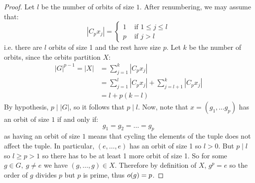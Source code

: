 \documentclass[../main.tex]{subfiles}
\begin{document}
\begin{proof}
  Let $l$ be the number of orbits of size $1$.
  After renumbering, we may assume that:
  \[
    |C_p x_j| = \begin{cases}
    1 & \text{ if } 1 \leq j \leq l \\
    p & \text{ if } j > l
    \end{cases}
  \]
  i.e. there are $l$ orbits of size 1 and the rest have size $p$.
  Let $k$ be the number of orbits, since the orbits partition $X$:
  \begin{align*}
    |G|^{p - 1} = |X| &= \sum_{j=1}^{k} |C_p x_j| \\
                      &= \sum_{j=1}^{l} |C_p x_j| + \sum_{j=l+1}^{k} |C_p x_j| \\
                      &= l + p(k - l)
  \end{align*}
  By hypothesis, $p \mid |G|$, so it follows that $p \mid l$.
  Now, note that $x = (g_1, \ldots g_p)$ has an orbit of size $1$ if and only if:
  \[
    g_1 = g_2 = \ldots = g_p
  \]
  as having an orbit of size $1$ means that cycling the elements of the tuple does not affect the tuple.
  In particular, $(e, \ldots, e)$ has an orbit of size 1 so $l > 0$.
  But $p \mid l$ so $l \geq p > 1$ so there has to be at least 1 more orbit of size 1.
  So for some $g \in G,\ g \neq e$ we have $(g, \ldots, g) \in X$.
  Therefore by definition of $X$, $g^{p} = e$ so the order of $g$ divides $p$ but $p$ is prime, thus $o(g) = p$.
\end{proof}
\end{document}
